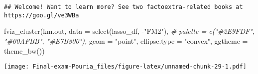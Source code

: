 \documentclass[
]{article}
\newenvironment{Shaded}{\begin{snugshade}}{\end{snugshade}}
\newcommand{\AttributeTok}[1]{\textcolor[rgb]{0.77,0.63,0.00}{#1}}
\newcommand{\CommentTok}[1]{\textcolor[rgb]{0.56,0.35,0.01}{\textit{#1}}}
\newcommand{\FunctionTok}[1]{\textcolor[rgb]{0.00,0.00,0.00}{#1}}
\newcommand{\NormalTok}[1]{#1}
\newcommand{\SpecialCharTok}[1]{\textcolor[rgb]{0.00,0.00,0.00}{#1}}
\newcommand{\StringTok}[1]{\textcolor[rgb]{0.31,0.60,0.02}{#1}}
\begin{document}
\begin{verbatim}
## Welcome! Want to learn more? See two factoextra-related books at https://goo.gl/ve3WBa
\end{verbatim}

\begin{Shaded}
\begin{Highlighting}[]
\FunctionTok{fviz\_cluster}\NormalTok{(km.out, }\AttributeTok{data =} \FunctionTok{select}\NormalTok{(lasso\_df, }\SpecialCharTok{{-}}\StringTok{"FM2"}\NormalTok{),}
             \CommentTok{\# palette = c("\#2E9FDF", "\#00AFBB", "\#E7B800"), }
             \AttributeTok{geom =} \StringTok{"point"}\NormalTok{,}
             \AttributeTok{ellipse.type =} \StringTok{"convex"}\NormalTok{, }
             \AttributeTok{ggtheme =} \FunctionTok{theme\_bw}\NormalTok{())}
\end{Highlighting}
\end{Shaded}

\texttt{[image: Final-exam-Pouria\_files/figure-latex/unnamed-chunk-29-1.pdf]}
\end{document}
